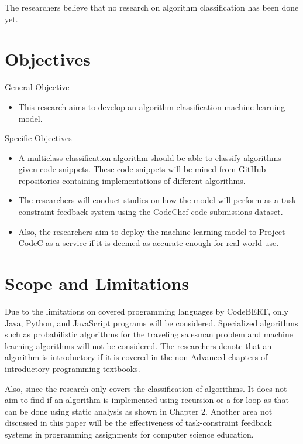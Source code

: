 The researchers believe that no research on algorithm classification has been done yet.

\section{Objectives}
General Objective
\begin{itemize}
    \item This research aims to develop an algorithm classification machine learning model. 
\end{itemize}

Specific Objectives
\begin{itemize}
    \item A multiclass classification algorithm should be able to classify algorithms given code snippets. These code snippets will be mined from GitHub repositories containing implementations of different algorithms.
    \item The researchers will conduct studies on how the model will perform as a task-constraint feedback system using the CodeChef code submissions dataset.
    \item Also, the researchers aim to deploy the machine learning model to Project CodeC as a service if it is deemed as accurate enough for real-world use.
\end{itemize}




\section{Scope and Limitations}

Due to the limitations on covered programming languages by CodeBERT, only Java, Python, 
and JavaScript programs will be considered. Specialized algorithms such as probabilistic 
algorithms for the traveling salesman problem and machine learning algorithms will not be 
considered. The researchers denote that an algorithm is introductory if it is covered in 
the non-Advanced chapters of introductory programming textbooks\cite{velivckovic2021clrs}\cite{skiena2020algorithm}\cite{sedgewick2011algorithms}. 

Also, since the research only covers the classification of algorithms. It does not aim to find 
if an algorithm is implemented using recursion or a for loop as that can be done using static 
analysis as shown in Chapter 2. Another area not discussed in this paper will be the effectiveness 
of task-constraint feedback systems in programming assignments for computer science education.  

